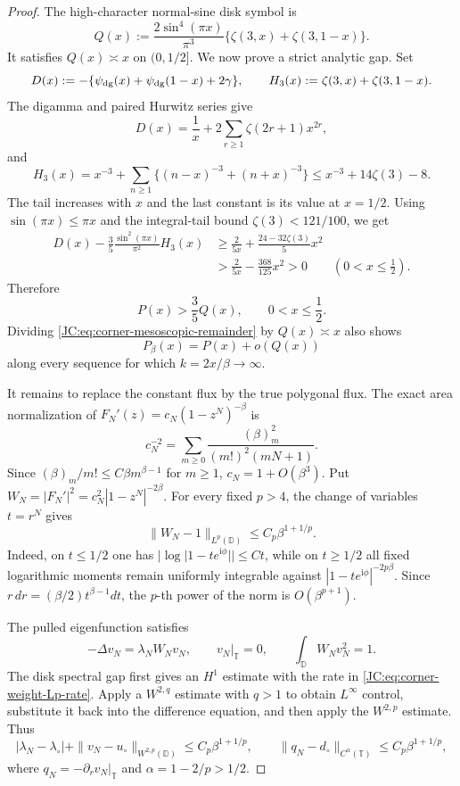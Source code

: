 \documentclass[11pt]{amsart}
\numberwithin{equation}{section}
\theoremstyle{definition}
\theoremstyle{remark}
\begin{document}
\begin{proof}
The high-character normal-sine disk symbol is
\begin{equation}\label{JC:eq:corner-disk-symbol}
 Q(x):=\frac{2\sin^4(\pi x)}{\pi^3}
 \{\zeta(3,x)+\zeta(3,1-x)\}.
\end{equation}
It satisfies $Q(x)\asymp x$ on $(0,1/2]$.  We now prove a strict
analytic gap.  Set
\[
 D(x):=-\{\psi_{\rm dg}(x)+\psi_{\rm dg}(1-x)+2\gamma\},
 \qquad H_3(x):=\zeta(3,x)+\zeta(3,1-x).
\]
The digamma and paired Hurwitz series give
\[
 D(x)=\frac1x+2\sum_{r\ge1}\zeta(2r+1)x^{2r},
\]
and
\[
 H_3(x)=x^{-3}+\sum_{n\ge1}\{(n-x)^{-3}+(n+x)^{-3}\}
 \le x^{-3}+14\zeta(3)-8.
\]
The tail increases with $x$ and the last constant is its value at
$x=1/2$.  Using $\sin(\pi x)\le\pi x$ and the integral-tail bound
$\zeta(3)<121/100$, we get
\begin{align*}
 D(x)-\frac35\frac{\sin^2(\pi x)}{\pi^2}H_3(x)
 &\ge\frac{2}{5x}+\frac{24-32\zeta(3)}5x^2\\
 &>\frac{2}{5x}-\frac{368}{125}x^2>0
 \qquad(0<x\le\tfrac12).
\end{align*}
Therefore
\begin{equation}\label{JC:eq:corner-three-fifths}
 \boxed{P(x)>\frac35Q(x),\qquad0<x\le\frac12.}
\end{equation}
Dividing \eqref{JC:eq:corner-mesoscopic-remainder} by $Q(x)\asymp x$
also shows
\begin{equation}\label{JC:eq:corner-relative-mesoscopic}
 P_\beta(x)=P(x)+o(Q(x))
\end{equation}
along every sequence for which $k=2x/\beta\to\infty$.

It remains to replace the constant flux by the true polygonal flux.
The exact area normalization of
$F_N'(z)=c_N(1-z^N)^{-\beta}$ is
\[
 c_N^{-2}=\sum_{m\ge0}
 \frac{(\beta)_m^2}{(m!)^2(mN+1)}.
\]
Since $(\beta)_m/m!\le C\beta m^{\beta-1}$ for $m\ge1$,
$c_N=1+O(\beta^3)$.  Put
$W_N=|F_N'|^2=c_N^2|1-z^N|^{-2\beta}$.  For every fixed $p>4$,
the change of variables $t=r^N$ gives
\begin{equation}\label{JC:eq:corner-weight-Lp-rate}
 \|W_N-1\|_{L^p(\mathbb D)}
 \le C_p\beta^{1+1/p}.
\end{equation}
Indeed, on $t\le1/2$ one has
$|\log|1-te^{\mathrm i\phi}||\le Ct$, while on $t\ge1/2$ all fixed
logarithmic moments remain uniformly integrable against
$|1-te^{\mathrm i\phi}|^{-2p\beta}$.  Since
$r\,dr=(\beta/2)t^{\beta-1}dt$, the $p$-th power of the norm is
$O(\beta^{p+1})$.

The pulled eigenfunction satisfies
\[
 -\Delta v_N=\lambda_NW_Nv_N,\qquad v_N|_{\mathbb T}=0,
 \qquad\int_{\mathbb D}W_Nv_N^2=1.
\]
The disk spectral gap first gives an $H^1$ estimate with the rate in
\eqref{JC:eq:corner-weight-Lp-rate}.  Apply a $W^{2,q}$ estimate with
$q>1$ to obtain $L^\infty$ control, substitute it back into the
difference equation, and then apply the $W^{2,p}$ estimate.  Thus
\begin{equation}\label{JC:eq:corner-flux-holder-rate}
 |\lambda_N-\lambda_\circ|
 +\|v_N-u_\circ\|_{W^{2,p}(\mathbb D)}
 \le C_p\beta^{1+1/p},
 \qquad
 \|q_N-d_\circ\|_{C^\alpha(\mathbb T)}
 \le C_p\beta^{1+1/p},
\end{equation}
where $q_N=-\partial_rv_N|_{\mathbb T}$ and
$\alpha=1-2/p>1/2$.


\end{proof}
\end{document}

